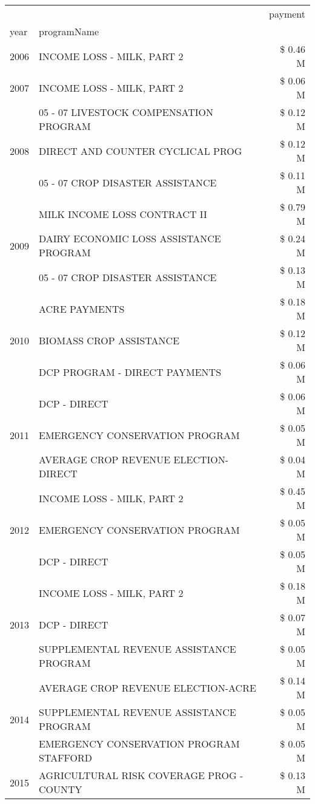 \begin{tabular}{llr}
\toprule
 &  & payment \\
year & programName &  \\
\midrule
2006 & INCOME LOSS - MILK, PART 2 & \$ 0.46 M \\
\cline{1-3}
2007 & INCOME LOSS - MILK, PART 2 & \$ 0.06 M \\
\cline{1-3}
\multirow[t]{3}{*}{2008} & 05 - 07 LIVESTOCK COMPENSATION PROGRAM & \$ 0.12 M \\
 & DIRECT AND COUNTER CYCLICAL PROG & \$ 0.12 M \\
 & 05 - 07 CROP DISASTER ASSISTANCE & \$ 0.11 M \\
\cline{1-3}
\multirow[t]{3}{*}{2009} & MILK INCOME LOSS CONTRACT II & \$ 0.79 M \\
 & DAIRY ECONOMIC LOSS ASSISTANCE PROGRAM & \$ 0.24 M \\
 & 05 - 07 CROP DISASTER ASSISTANCE & \$ 0.13 M \\
\cline{1-3}
\multirow[t]{3}{*}{2010} & ACRE PAYMENTS & \$ 0.18 M \\
 & BIOMASS CROP ASSISTANCE & \$ 0.12 M \\
 & DCP PROGRAM - DIRECT PAYMENTS & \$ 0.06 M \\
\cline{1-3}
\multirow[t]{3}{*}{2011} & DCP - DIRECT & \$ 0.06 M \\
 & EMERGENCY CONSERVATION PROGRAM & \$ 0.05 M \\
 & AVERAGE CROP REVENUE ELECTION-DIRECT & \$ 0.04 M \\
\cline{1-3}
\multirow[t]{3}{*}{2012} & INCOME LOSS - MILK, PART 2 & \$ 0.45 M \\
 & EMERGENCY CONSERVATION PROGRAM & \$ 0.05 M \\
 & DCP - DIRECT & \$ 0.05 M \\
\cline{1-3}
\multirow[t]{3}{*}{2013} & INCOME LOSS - MILK, PART 2 & \$ 0.18 M \\
 & DCP - DIRECT & \$ 0.07 M \\
 & SUPPLEMENTAL REVENUE ASSISTANCE PROGRAM & \$ 0.05 M \\
\cline{1-3}
\multirow[t]{3}{*}{2014} & AVERAGE CROP REVENUE ELECTION-ACRE & \$ 0.14 M \\
 & SUPPLEMENTAL REVENUE ASSISTANCE PROGRAM & \$ 0.05 M \\
 & EMERGENCY CONSERVATION PROGRAM STAFFORD & \$ 0.05 M \\
\cline{1-3}
\multirow[t]{3}{*}{2015} & AGRICULTURAL RISK COVERAGE PROG - COUNTY & \$ 0.13 M \\

\end{tabular}
